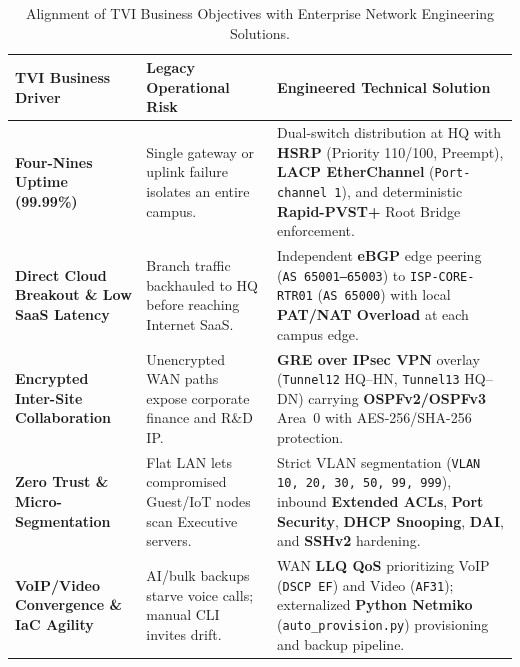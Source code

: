 \begin{table}[H]
\centering
\caption{Alignment of TVI Business Objectives with Enterprise Network Engineering Solutions.}
\label{tab:business_alignment}
\footnotesize
\begin{tabularx}{\textwidth}{|p{3.4cm}|p{4.3cm}|X|}
\hline
\textbf{TVI Business Driver} & \textbf{Legacy Operational Risk} & \textbf{Engineered Technical Solution} \\
\hline
\textbf{Four-Nines Uptime (99.99\%)} & Single gateway or uplink failure isolates an entire campus. & Dual-switch distribution at HQ with \textbf{HSRP} (Priority 110/100, Preempt), \textbf{LACP EtherChannel} (\texttt{Port-channel 1}), and deterministic \textbf{Rapid-PVST+} Root Bridge enforcement. \\
\hline
\textbf{Direct Cloud Breakout \& Low SaaS Latency} & Branch traffic backhauled to HQ before reaching Internet SaaS. & Independent \textbf{eBGP} edge peering (\texttt{AS 65001--65003}) to \texttt{ISP-CORE-RTR01} (\texttt{AS 65000}) with local \textbf{PAT/NAT Overload} at each campus edge. \\
\hline
\textbf{Encrypted Inter-Site Collaboration} & Unencrypted WAN paths expose corporate finance and R\&D IP. & \textbf{GRE over IPsec VPN} overlay (\texttt{Tunnel12} HQ--HN, \texttt{Tunnel13} HQ--DN) carrying \textbf{OSPFv2/OSPFv3} Area~0 with AES-256/SHA-256 protection. \\
\hline
\textbf{Zero Trust \& Micro-Segmentation} & Flat LAN lets compromised Guest/IoT nodes scan Executive servers. & Strict VLAN segmentation (\texttt{VLAN 10, 20, 30, 50, 99, 999}), inbound \textbf{Extended ACLs}, \textbf{Port Security}, \textbf{DHCP Snooping}, \textbf{DAI}, and \textbf{SSHv2} hardening. \\
\hline
\textbf{VoIP/Video Convergence \& IaC Agility} & AI/bulk backups starve voice calls; manual CLI invites drift. & WAN \textbf{LLQ QoS} prioritizing VoIP (\texttt{DSCP EF}) and Video (\texttt{AF31}); externalized \textbf{Python Netmiko} (\texttt{auto\_provision.py}) provisioning and backup pipeline. \\
\hline
\end{tabularx}
\end{table}
